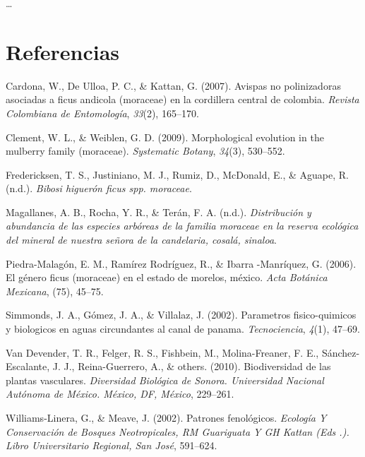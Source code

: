 \documentclass[11pt,]{article}
\begin{document}
\ldots

\section*{Referencias}\label{referencias}

\hypertarget{refs}{}
\hypertarget{ref-cardona2007avispas}{}
Cardona, W., De Ulloa, P. C., \& Kattan, G. (2007). Avispas no
polinizadoras asociadas a ficus andicola (moraceae) en la cordillera
central de colombia. \emph{Revista Colombiana de Entomología},
\emph{33}(2), 165--170.

\hypertarget{ref-clement2009morphological}{}
Clement, W. L., \& Weiblen, G. D. (2009). Morphological evolution in the
mulberry family (moraceae). \emph{Systematic Botany}, \emph{34}(3),
530--552.

\hypertarget{ref-fredericksenbibosi}{}
Fredericksen, T. S., Justiniano, M. J., Rumiz, D., McDonald, E., \&
Aguape, R. (n.d.). \emph{Bibosi higuerón ficus spp. moraceae}.

\hypertarget{ref-magallanes1972distribucion}{}
Magallanes, A. B., Rocha, Y. R., \& Terán, F. A. (n.d.).
\emph{Distribución y abundancia de las especies arbóreas de la familia
moraceae en la reserva ecológica del mineral de nuestra señora de la
candelaria, cosalá, sinaloa}.

\hypertarget{ref-piedra2006genero}{}
Piedra-Malagón, E. M., Ramírez Rodríguez, R., \& Ibarra -Manríquez, G.
(2006). El género ficus (moraceae) en el estado de morelos, méxico.
\emph{Acta Botánica Mexicana}, (75), 45--75.

\hypertarget{ref-simmonds2002parametros}{}
Simmonds, J. A., Gómez, J. A., \& Villalaz, J. (2002). Parametros
fisico-quimicos y biologicos en aguas circundantes al canal de panama.
\emph{Tecnociencia}, \emph{4}(1), 47--69.

\hypertarget{ref-van2010biodiversidad}{}
Van Devender, T. R., Felger, R. S., Fishbein, M., Molina-Freaner, F. E.,
Sánchez-Escalante, J. J., Reina-Guerrero, A., \& others. (2010).
Biodiversidad de las plantas vasculares. \emph{Diversidad Biológica de
Sonora. Universidad Nacional Autónoma de México. México, DF, México},
229--261.

\hypertarget{ref-williams2002patrones}{}
Williams-Linera, G., \& Meave, J. (2002). Patrones fenológicos.
\emph{Ecología Y Conservación de Bosques Neotropicales, RM Guariguata Y
GH Kattan (Eds .). Libro Universitario Regional, San José}, 591--624.




\newpage
\singlespacing 
\end{document}
